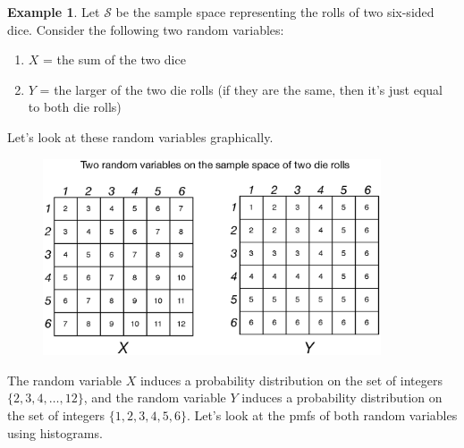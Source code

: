 \documentclass[12pt]{article}
\theoremstyle{definition}
\newtheorem*{example}{Example}
\theoremstyle{remark}
\def\cals{{\mathcal S}}
\begin{document}
\begin{example}Let $\cals$ be the sample space representing the rolls of two six-sided dice. Consider the following two random variables:
\begin{enumerate}
\item $X$ = the sum of the two dice
\item $Y$ = the larger of the two die rolls (if they are the same, then it's just equal to both die rolls)
\end{enumerate} 
Let's look at these random variables graphically.
\begin{figure}[H]
\centering
\includegraphics[width=10cm]{2dicervs.eps}
\end{figure}

The random variable $X$ induces a probability distribution on the set of integers $\{2, 3, 4, \dots, 12\}$, and the random variable $Y$ induces a probability distribution on the set of integers $\{1, 2, 3, 4, 5, 6\}$. Let's look at the pmfs of both random variables using histograms.


\end{example}
\end{document}

